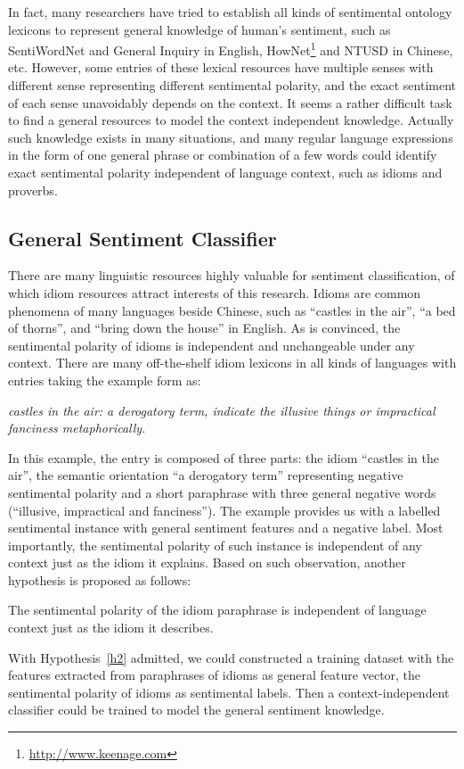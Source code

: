\documentclass{llncs}
\begin{document}
In fact, many researchers have tried to establish all kinds of sentimental ontology lexicons to represent general knowledge of human’s sentiment, such as SentiWordNet \cite{xsongx:b17} and General Inquiry \cite{xsongx:b18} in English, HowNet\footnote{\url{http://www.keenage.com}} \cite{xsongx:b19} and NTUSD \cite{xsongx:b20} in Chinese, etc. 
However, some entries of these lexical resources have multiple senses with different sense representing different sentimental polarity, and the exact sentiment of each sense unavoidably depends on the context.
It seems a rather difficult task to find a general resources to model the context independent knowledge.
Actually such knowledge exists in many situations, and many regular language expressions in the form of one general phrase or combination of a few words could identify exact sentimental polarity independent of language context, such as idioms and proverbs. 

\subsection{General Sentiment Classifier}
\label{general}

There are many linguistic resources highly valuable for sentiment classification, of which idiom resources attract interests of this research. 
Idioms are common phenomena of many languages beside Chinese, such as ``castles in the air'', ``a bed of thorns'', and ``bring down the house'' in English.
As is convinced, the sentimental polarity of idioms is independent and unchangeable under any context. 
There are many off-the-shelf idiom lexicons in all kinds of languages with entries taking the example form as:

\textit{castles in the air: a derogatory term, indicate the illusive things or impractical fanciness metaphorically.}

In this example, the entry is composed of three parts: the idiom ``castles in the air'', the semantic orientation ``a derogatory term'' representing negative
sentimental polarity and a short paraphrase with three general negative words (``illusive, impractical and fanciness''). 
The example provides us with a labelled sentimental instance with general sentiment features and a negative label.
Most importantly, the sentimental polarity of such instance is independent of any context just as the idiom it explains. 
Based on such observation, another hypothesis is proposed as follows:
\begin{hypothesis}
\label{h2}
The sentimental polarity of the idiom paraphrase is independent of language context just as the idiom it describes.
\end{hypothesis}
With Hypothesis~\ref{h2} admitted, we could constructed a training dataset with the features extracted from paraphrases of idioms as general feature vector, the sentimental polarity of idioms as sentimental labels. 
Then a context-independent classifier could be trained to model the general sentiment knowledge.
\end{document}
